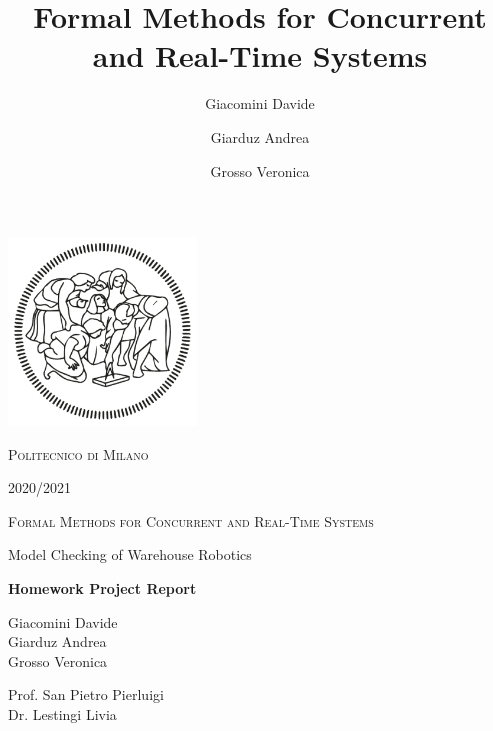 \documentclass[12pt,oneside,a4paper]{article}
\title{Formal Methods for Concurrent and Real-Time Systems}
\author{Giacomini Davide \and Giarduz Andrea \and Grosso Veronica}
\begin{document}
\begin{titlepage}
\begin{center}
        \vspace*{-1,5cm}
		\includegraphics[width=5cm]{resources/logo.png}
		
        \LARGE{{\scshape Politecnico di Milano}}
        
        \LARGE{}
        
        \LARGE{2020/2021}
        
        \vspace*{1cm}
        \Large{{\scshape Formal Methods for Concurrent and Real-Time Systems}}
        
        \vspace*{1cm}
        \Huge{Model Checking of Warehouse Robotics}
 
 		\Large{\textbf{Homework Project Report}}
        \vfill
        
        \vspace*{0,8cm}
        \Large{Giacomini Davide\\
        Giarduz Andrea\\
        Grosso Veronica
        }
            
        \vspace{1,2cm}
           
        \Large
        Prof. San Pietro Pierluigi\\
        Dr. Lestingi Livia
    \end{center}
\end{titlepage}

\setcounter{tocdepth}{3}
\tableofcontents

\newpage

\listoffigures
{}
\listoftables
{}

\newpage
{}





\end{document}
